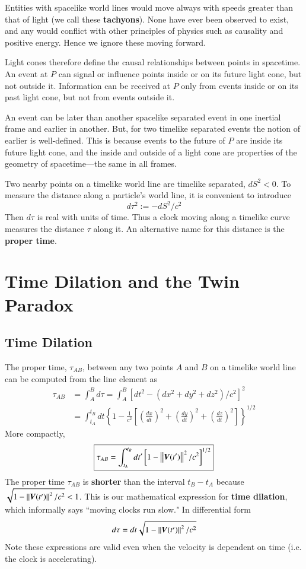 Entities with spacelike world lines would move always with speeds greater than that of light (we call these \textbf{tachyons}). None have ever been observed to exist, and any would conflict with other principles of physics such as causality and positive energy. Hence we ignore these moving forward.

Light cones therefore define the causal relationships between points in spacetime. An event at $P$ can signal or influence points inside or on its future light cone, but not outside it. Information can be received at $P$ only from events inside or on its past light cone, but not from events outside it. 

\begin{rmk}
    An event can be later than another spacelike separated event in one inertial frame and earlier in another. But, for two timelike separated events the notion of earlier is well-defined. This is because events to the future of $P$ are inside its future light cone, and the inside and outside of a light cone are properties of the geometry of spacetime---the same in all frames.
\end{rmk}

Two nearby points on a timelike world line are timelike separated, $dS^2 < 0$. To measure the distance along a particle's world line, it is convenient to introduce $$d\tau^2 := -dS^2/c^2$$
Then $d\tau$ is real with units of time. Thus a clock moving along a timelike curve measures the distance $\tau$ along it. An alternative name for this distance is the \textbf{proper time}.

\section{Time Dilation and the Twin Paradox}
\label{sec:timeDil}

\subsection{Time Dilation}

The proper time, $\tau_{AB}$, between any two points $A$ and $B$ on a timelike world line can be computed from the line element as \begin{align*}
    \tau_{AB} &= \int_A^Bd\tau = \int_A^B\left[dt^2-(dx^2+dy^2+dz^2)/c^2\right]^2 \\
    &= \int_{t_A}^{t_B}dt\left\{1-\frac{1}{c^2}\left[\left(\frac{dx}{dt}\right)^2+\left(\frac{dy}{dt}\right)^2+\left(\frac{dz}{dt}\right)^2\right]\right\}^{1/2}
\end{align*}
More compactly, \begin{equation}
    \boxed{\tau_{AB} = \int_{t_A}^{t_B}dt'\left[1-\norm{\vec{V}(t')}^2/c^2\right]^{1/2}}
\end{equation}
The proper time $\tau_{AB}$ is \textbf{shorter} than the interval $t_B-t_A$ because $\sqrt{1-\norm{\vec{V}(t')}^2/c^2} < 1$. This is our mathematical expression for \textbf{time dilation}, which informally says ``moving clocks run slow." In differential form $$d\tau = dt\sqrt{1-\norm{\vec{V}(t')}^2/c^2}$$
Note these expressions are valid even when the velocity is dependent on time (i.e. the clock is accelerating).

